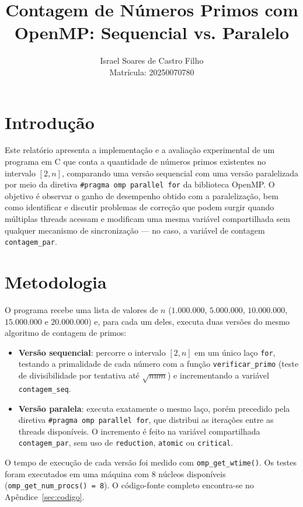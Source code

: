 \documentclass[a4paper,12pt]{article}
\title{Contagem de Números Primos com OpenMP: Sequencial vs. Paralelo}
\author{Israel Soares de Castro Filho \\ Matrícula: 20250070780}
\date{}
\begin{document}
\maketitle

\section{Introdução}

Este relatório apresenta a implementação e a avaliação experimental de um programa em C
que conta a quantidade de números primos existentes no intervalo $[2, n]$, comparando uma
versão sequencial com uma versão paralelizada por meio da diretiva \texttt{\#pragma omp
parallel for} da biblioteca OpenMP. O objetivo é observar o ganho de desempenho obtido com
a paralelização, bem como identificar e discutir problemas de correção que podem surgir
quando múltiplas threads acessam e modificam uma mesma variável compartilhada sem qualquer
mecanismo de sincronização — no caso, a variável de contagem \texttt{contagem\_par}.

\section{Metodologia}

O programa recebe uma lista de valores de $n$ ($1.000.000$, $5.000.000$, $10.000.000$,
$15.000.000$ e $20.000.000$) e, para cada um deles, executa duas versões do mesmo
algoritmo de contagem de primos:

\begin{itemize}
    \item \textbf{Versão sequencial}: percorre o intervalo $[2, n]$ em um único laço
    \texttt{for}, testando a primalidade de cada número com a função
    \texttt{verificar\_primo} (teste de divisibilidade por tentativa até $\sqrt{num}$) e
    incrementando a variável \texttt{contagem\_seq}.
    \item \textbf{Versão paralela}: executa exatamente o mesmo laço, porém precedido pela
    diretiva \texttt{\#pragma omp parallel for}, que distribui as iterações entre as
    threads disponíveis. O incremento é feito na variável compartilhada
    \texttt{contagem\_par}, sem uso de \texttt{reduction}, \texttt{atomic} ou
    \texttt{critical}.
\end{itemize}

O tempo de execução de cada versão foi medido com \texttt{omp\_get\_wtime()}. Os testes
foram executados em uma máquina com 8 núcleos disponíveis (\texttt{omp\_get\_num\_procs()
= 8}). O código-fonte completo encontra-se no Apêndice~\ref{sec:codigo}.
\end{document}
